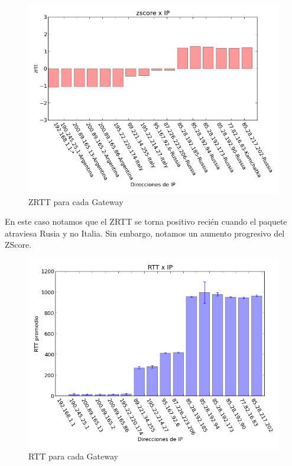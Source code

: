 \begin{figure}[H]
	\begin{center}
		  \includegraphics[scale=0.5]{../graficos_informe/kamgu_zscore.png}
		  \caption{ZRTT para cada Gateway}
		  \label{fig:contra1}
	\end{center}
\end{figure}

En este caso notamos que el ZRTT se torna positivo recién cuando el paquete atraviesa Rusia y no Italia. Sin embargo, notamos un aumento progresivo del ZScore.

\begin{figure}[H]
	\begin{center}
		  \includegraphics[scale=0.5]{../graficos_informe/kamgu_rtt.png}
		  \caption{RTT para cada Gateway}
		  \label{fig:contra1}
	\end{center}
\end{figure}

